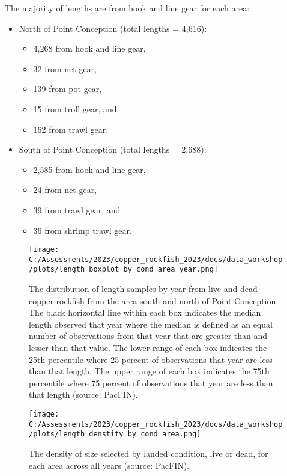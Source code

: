 \documentclass[
]{article}
\providecommand{\tightlist}{%
  \setlength{\itemsep}{0pt}\setlength{\parskip}{0pt}}
\begin{document}
The majority of lengths are from hook and line gear for each area:

\begin{itemize}
\tightlist
\item
  North of Point Conception (total lengths = 4,616):

  \begin{itemize}
  \tightlist
  \item
    4,268 from hook and line gear,
  \item
    32 from net gear,
  \item
    139 from pot gear,
  \item
    15 from troll gear, and
  \item
    162 from trawl gear.
  \end{itemize}
\item
  South of Point Conception (total lengths = 2,688):

  \begin{itemize}
  \tightlist
  \item
    2,585 from hook and line gear,
  \item
    24 from net gear,
  \item
    39 from trawl gear, and
  \item
    36 from shrimp trawl gear.
  \end{itemize}
\end{itemize}

\begin{figure}
\centering
\texttt{[image: C:/Assessments/2023/copper\_rockfish\_2023/docs/data\_workshop/plots/length\_boxplot\_by\_cond\_area\_year.png]}
\caption{The distribution of length samples by year from live and dead
copper rockfish from the area south and north of Point Conception. The
black horizontal line within each box indicates the median length
observed that year where the median is defined as an equal number of
observations from that year that are greater than and lesser than that
value. The lower range of each box indicates the 25th percentile where
25 percent of observations that year are less than that length. The
upper range of each box indicates the 75th percentile where 75 percent
of observations that year are less than that length (source:
PacFIN).\label{fig:com-length-dist}}
\end{figure}

\begin{figure}
\centering
\texttt{[image: C:/Assessments/2023/copper\_rockfish\_2023/docs/data\_workshop/plots/length\_denstity\_by\_cond\_area.png]}
\caption{The density of size selected by landed condition, live or dead,
for each area across all years (source:
PacFIN).\label{fig:com-marginal-length-dist}}
\end{figure}
\end{document}
